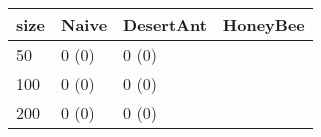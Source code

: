 \begin{tabular} {|l|l|l|l|}
\hline
size & Naive & DesertAnt & HoneyBee \\
\hline
50 & 0 (0)  & 0 (0)  &  \\
100 & 0 (0)  & 0 (0)  &  \\
200 & 0 (0)  & 0 (0)  &  \\
\hline
\end{tabular}
